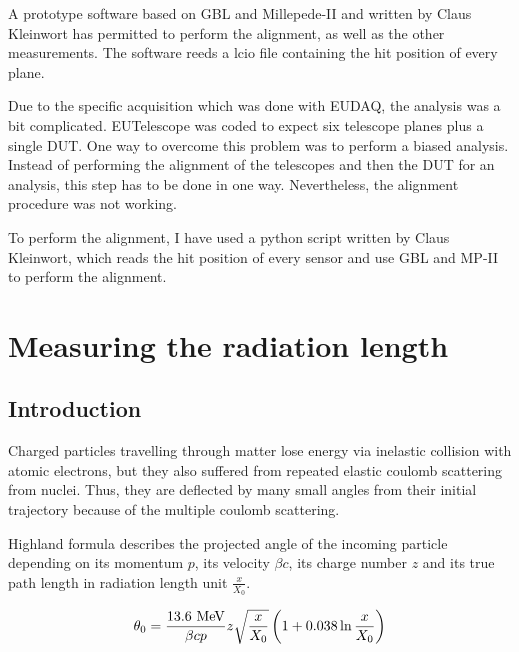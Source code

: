     A prototype software based on GBL and Millepede-II and written by Claus Kleinwort has permitted to perform the alignment, as well as the other measurements.
    The software reeds a lcio file containing the hit position of every plane.

    Due to the specific acquisition which was done with EUDAQ, the analysis was a bit complicated.
    EUTelescope was coded to expect six telescope planes plus a single DUT.
    One way to overcome this problem was to perform a biased analysis.
    Instead of performing the alignment of the telescopes and then the DUT for an analysis, this step has to be done in one way.
    Nevertheless, the alignment procedure was not working.

    To perform the alignment, I have used a python script written by Claus Kleinwort, which reads the hit position of every sensor and use GBL and MP-II to perform the alignment.


  \section{Measuring the radiation length}

    \subsection{Introduction}

    Charged particles travelling through matter lose energy via inelastic collision with atomic electrons, but they also suffered from repeated elastic coulomb scattering from nuclei.
    Thus, they are deflected by many small angles from their initial trajectory because of the multiple coulomb scattering.

    Highland formula describes the projected angle of the incoming particle depending on its momentum $p$, its velocity $\beta c$, its charge number $z$ and its true path length in radiation length unit $\frac{x}{X_{0}}$.

    \begin{equation}
      \theta_{0} = \frac{13.6~\rm{MeV}}{\beta c p} z \sqrt{\frac{x}{X_{0}}}\left(1 + 0.038 \ln{\frac{x}{X_{0}}}\right)
    \end{equation}

